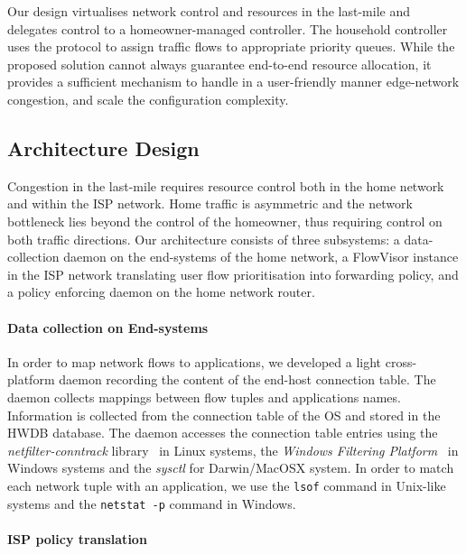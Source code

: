 Our design virtualises network control and resources in the last-mile and
delegates control to a homeowner-managed \of controller.  The household
controller uses the \of protocol to assign traffic flows to appropriate priority
queues.  While the proposed solution cannot always guarantee end-to-end resource
allocation, it provides a sufficient mechanism to handle in a user-friendly
manner edge-network congestion, and scale the configuration complexity. 

\subsection{Architecture Design} \label{s:qos:architecture}

Congestion in the last-mile requires resource control both in the home network
and within the ISP network. Home traffic is asymmetric and  the network
bottleneck lies beyond the control of the homeowner, thus requiring control on
both traffic directions.  Our architecture consists of three subsystems: a
data-collection daemon on the end-systems of the home network, a FlowVisor
instance in the ISP network translating user flow prioritisation into
forwarding policy, and a policy enforcing daemon on the home network router. 

\paragraph*{Data collection on End-systems}

In order to map network flows to applications, we developed a light cross-platform
daemon recording the content of the end-host connection table.  The daemon
collects mappings between flow tuples and applications names.  Information is
collected from the connection table of the OS and stored in the HWDB database.
The daemon accesses the connection table entries using the
\textit{netfilter-conntrack} library~ in Linux systems, the
\textit{Windows Filtering Platform}~ in Windows systems and the
\textit{sysctl} for Darwin/MacOSX system.  In order to match each network tuple
with an application, we use the \texttt{lsof} command in Unix-like systems and
the \texttt{netstat -p} command in Windows.


\paragraph*{ISP policy translation}

